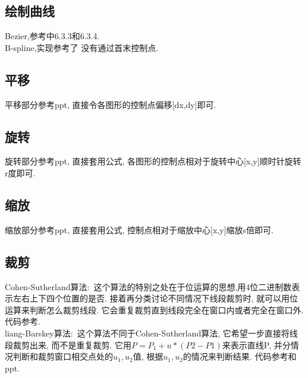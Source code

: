 \documentclass[a4paper,UTF8]{article}
\theoremstyle{definition}
\begin{document}
\subsection{绘制曲线}
\indent Bezier,参考\cite{sun_2006}中6.3.3和6.3.4.\\
\indent B-spline,实现参考了\cite{bspline_web} 没有通过首末控制点.

\subsection{平移}
\indent 平移部分参考ppt, 直接令各图形的控制点偏移[dx,dy]即可.

\subsection{旋转}
\indent 旋转部分参考ppt, 直接套用公式, 各图形的控制点相对于旋转中心[x,y]顺时针旋转r度即可.

\subsection{缩放}
\indent 缩放部分参考ppt, 直接套用公式, 控制点相对于缩放中心[x,y]缩放s倍即可.

\subsection{裁剪}
\indent Cohen-Sutherland算法:\ 这个算法的特别之处在于位运算的思想,用4位二进制数表示左右上下四个位置的是否. 接着再分类讨论不同情况下线段裁剪时, 就可以用位运算来判断怎么裁剪线段. 它会重复裁剪直到线段完全在窗口内或者完全在窗口外.
代码参考\cite{cohen_web}.\\
\indent liang-Barskey算法:\ 这个算法不同于Cohen-Sutherland算法, 它希望一步直接将线段裁剪出来, 而不是重复裁剪.
它用$P=P_1+u*(P2-P1)$来表示直线P, 并分情况判断和裁剪窗口相交点处的$u_1,u_2$值, 根据$u_1,u_2$的情况来判断结果.
代码参考\cite{liang_web}和ppt.
\end{document}
